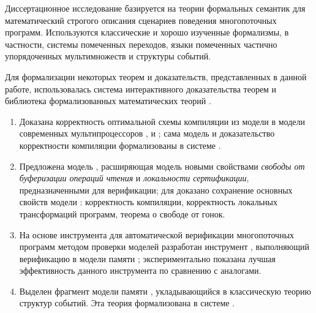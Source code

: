 
{\methods} Диссертационное исследование базируется на теории формальных семантик
для математический строгого описания сценариев поведения многопоточных программ. 
Используются классические и хорошо изученные формализмы, в частности, 
системы помеченных переходов, языки помеченных частично 
упорядоченных мультимножеств и структуры событий. 

Для формализации некоторых теорем и доказательств, представленных в данной работе, 
использовалась система интерактивного доказательства теорем \coq 
и библиотека формализованных математических теорий \mathcomp.


{}
\begin{enumerate}[beginpenalty=10000] %

  \item Доказана корректность оптимальной схемы компиляции из модели \Wkm
    в модели современных мультипроцессоров \TSO, \ARM и \POWER;
    сама модель \Wkm и доказательство корректности компиляции
    формализованы в системе \coq.

  \item Предложена модель \WkmS, расширяющая модель \Wkm 
    новыми свойствами \emph{свободы от буферизации операций чтения}
    и \emph{локальности сертификации}, предназначенными для верификации;
    для \WkmS доказано сохранение основных свойств модели \Wkm: корректность компиляции,
    корректность локальных трансформаций программ,
    теорема о свободе от гонок.

  \item На основе инструмента \genmc для автоматической 
    верификации многопоточных программ методом проверки моделей
    разработан инструмент \wmc, выполняющий верификацию 
    в модели памяти \WkmS;
    экспериментально показана лучшая эффективность 
    данного инструмента по сравнению с аналогами.

  \item Выделен фрагмент модели памяти \Wkm, укладывающийся в
    классическую теорию структур событий. Эта теория формализована в системе \coq.

\end{enumerate}

